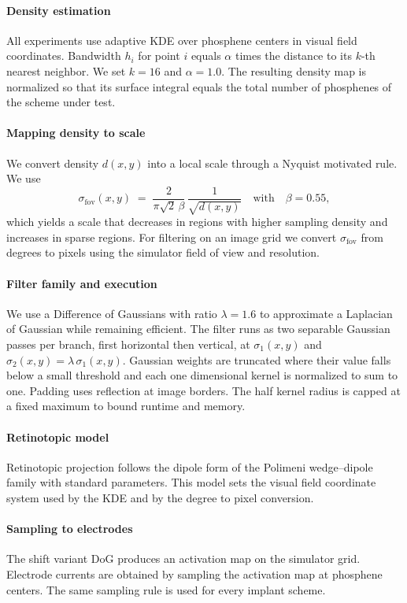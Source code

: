 \paragraph{Density estimation}
All experiments use adaptive KDE over phosphene centers in visual field coordinates. Bandwidth \(h_i\) for point \(i\) equals \(\alpha\) times the distance to its \(k\)-th nearest neighbor. We set \(k=16\) and \(\alpha=1.0\). The resulting density map is normalized so that its surface integral equals the total number of phosphenes of the scheme under test.

\paragraph{Mapping density to scale}
We convert density \(d(x,y)\) into a local scale through a Nyquist motivated rule. We use
\[
\sigma_{\text{fov}}(x,y) \;=\; \frac{2}{\pi \sqrt{2}\,\beta}\,\frac{1}{\sqrt{d(x,y)}} \quad\text{with}\quad \beta=0.55,
\]
which yields a scale that decreases in regions with higher sampling density and increases in sparse regions. For filtering on an image grid we convert \(\sigma_{\text{fov}}\) from degrees to pixels using the simulator field of view and resolution.

\paragraph{Filter family and execution}
We use a Difference of Gaussians with ratio \(\lambda=1.6\) to approximate a Laplacian of Gaussian while remaining efficient. The filter runs as two separable Gaussian passes per branch, first horizontal then vertical, at \(\sigma_1(x,y)\) and \(\sigma_2(x,y)=\lambda\,\sigma_1(x,y)\). Gaussian weights are truncated where their value falls below a small threshold and each one dimensional kernel is normalized to sum to one. Padding uses reflection at image borders. The half kernel radius is capped at a fixed maximum to bound runtime and memory.

\paragraph{Retinotopic model}
Retinotopic projection follows the dipole form of the Polimeni wedge–dipole family with standard parameters. This model sets the visual field coordinate system used by the KDE and by the degree to pixel conversion.

\paragraph{Sampling to electrodes}
The shift variant DoG produces an activation map on the simulator grid. Electrode currents are obtained by sampling the activation map at phosphene centers. The same sampling rule is used for every implant scheme.



